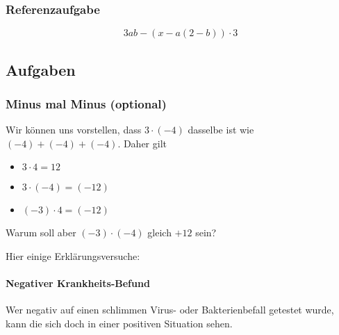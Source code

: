 \subsubsection{Referenzaufgabe}
$$3ab-(x-a(2-b))\cdot{}3$$

\newpage

\subsection*{Aufgaben}
\newpage


\subsubsection{Minus mal Minus (optional)}
Wir können uns vorstellen, dass $3 \cdot (-4)$ dasselbe ist wie $(-4) + (-4) + (-4)$. Daher gilt
\begin{itemize}
\item $3 \cdot 4 = 12$
\item $3 \cdot (-4) = (-12)$
\item $(-3) \cdot 4 = (-12)$
\end{itemize}
Warum soll aber $(-3)\cdot(-4)$ gleich $+12$ sein?

Hier einige Erklärungsversuche:


\paragraph{Negativer Krankheits-Befund}
Wer negativ auf einen schlimmen Virus- oder Bakterienbefall getestet wurde, kann
die sich doch in einer positiven Situation sehen.

